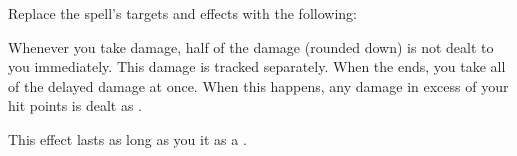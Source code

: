 Replace the spell's targets and effects with the following:
\begin{spellcontent}

\begin{augmenttargetinginfo}



\end{augmenttargetinginfo}


\begin{augmenteffects}



\spelleffect
Whenever you take damage, half of the damage (rounded down) is not dealt to you immediately.
This damage is tracked separately.
When the ends, you take all of the delayed damage at once.
When this happens, any damage in excess of your hit points is dealt as .

This effect lasts as long as you  it as a .








\end{augmenteffects}

\end{spellcontent}








